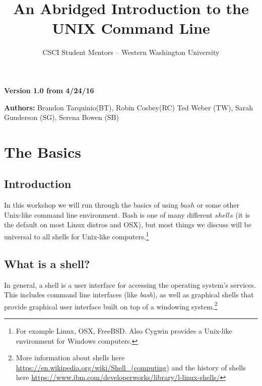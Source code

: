 \documentclass[oneside]{book}
\begin{document}
\title{An Abridged Introduction to the UNIX Command Line}
\author{CSCI Student Mentors \--- Western Washington University}
\date{}

\maketitle
\tableofcontents
\newpage


\begin{versionhistory}
    \begin{center}
        \large{\textbf{Version 1.0 from 4/24/16}}
    \end{center}
    \large{\textbf{Authors:} Brandon Tarquinio(BT), Robin Cosbey(RC)  Ted Weber (TW), Sarah Gunderson (SG), Serena Bowen (SB)}
\end{versionhistory}
\chapter{The Basics}

\section{Introduction}
In this workshop we will run through the basics of using $bash$ or some other Unix-like command line environment. Bash is one of many different  $shells$ (it is the default on most Linux distros and OSX), but most things we discuss will be universal to all shells for Unix-like computers.\footnote{For example Linux, OSX, FreeBSD. Also Cygwin provides a Unix-like environment for Windows computers.} 

\section{What is a shell?}
In general, a shell is a user interface for accessing the operating system's services. This includes command line interfaces (like \textit{bash}), as well as graphical shells that provide graphical user interface built on top of a windowing system.\footnote{More information about shells here \url{https://en.wikipedia.org/wiki/Shell_(computing)} and the history of shells here \url{https://www.ibm.com/developerworks/library/l-linux-shells/}} 
\end{document}
